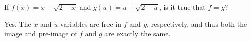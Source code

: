 \begin{exercise}
	If $f\left(x\right)=x+\sqrt{2-x}$ and $g\left(u\right)=u+\sqrt{2-u}$, is it true that $f=g$?
\end{exercise}
\begin{solution}
	Yes. The $x$ and $u$ variables are free in $f$ and $g$, respectively, and thus both the image and pre-image of $f$ and $g$ are exactly the same.
\end{solution}
